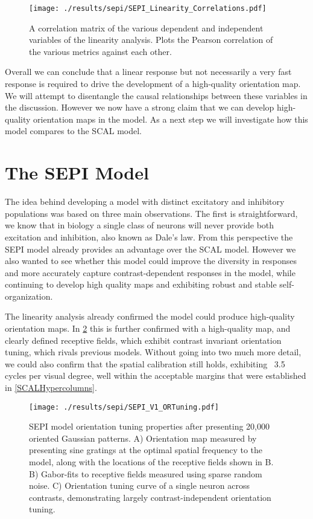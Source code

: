 \begin{figure}
	\centering
        \texttt{[image: ./results/sepi/SEPI\_Linearity\_Correlations.pdf]}
	\caption{A correlation matrix of the various dependent and
      independent variables of the linearity analysis. Plots the
      Pearson correlation of the various metrics against each other.}
	\label{SEPILinearityCorr}
\end{figure}

Overall we can conclude that a linear response but not necessarily a
very fast response is required to drive the development of a
high-quality orientation map. We will attempt to disentangle the
causal relationships between these variables in the
discussion. However we now have a strong claim that we can develop
high-quality orientation maps in the model. As a next step we will
investigate how this model compares to the SCAL model.

\section{The SEPI Model}

The idea behind developing a model with distinct excitatory and
inhibitory populations was based on three main observations. The first
is straightforward, we know that in biology a single class of neurons
will never provide both excitation and inhibition, also known as
Dale's law. From this perspective the SEPI model already provides an
advantage over the SCAL model. However we also wanted to see whether
this model could improve the diversity in responses and more
accurately capture contrast-dependent responses in the model, while
continuing to develop high quality maps and exhibiting robust and
stable self-organization.

The linearity analysis already confirmed the model could produce
high-quality orientation maps. In \ref{SEPIORTuning} this is further
confirmed with a high-quality map, and clearly defined receptive
fields, which exhibit contrast invariant orientation tuning, which
rivals previous models. Without going into two much more detail, we
could also confirm that the spatial calibration still holds,
exhibiting ~3.5 cycles per visual degree, well within the acceptable
margins that were established in \ref{SCALHypercolumns}.

\begin{figure}
	\centering
    \texttt{[image: ./results/sepi/SEPI\_V1\_ORTuning.pdf]}
	\caption{SEPI model orientation tuning properties after presenting
      20,000 oriented Gaussian patterns. A) Orientation map measured
      by presenting sine gratings at the optimal spatial frequency to
      the model, along with the locations of the receptive fields
      shown in B. B) Gabor-fits to receptive fields measured using
      sparse random noise. C) Orientation tuning curve of a single
      neuron across contrasts, demonstrating largely
      contrast-independent orientation tuning.}
	\label{SEPIORTuning}
\end{figure}

